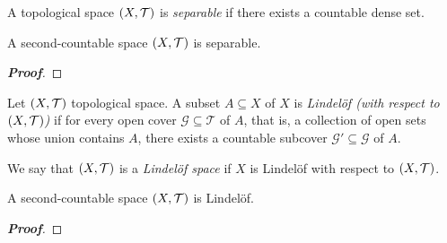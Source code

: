 \begin{definition}
  A topological space $\left(X,\mathcal{T}\right)$ is \textit{separable} if there exists a countable dense set.
\end{definition}

\begin{proposition}
  A second-countable space $\left(X,\mathcal{T}\right)$ is separable.

  \begin{proof}[\rm\textbf{Proof}]
    
  \end{proof}
\end{proposition}

\begin{definition}
  Let  $\left(X,\mathcal{T}\right)$ topological space. A subset $A\subseteq X$ of $X$ is \textit{Lindelöf (with respect to $\left(X,\mathcal{T}\right)$)} if for every open cover $\mathcal{G}\subseteq\mathcal{T}$ of $A$, that is, a collection of open sets whose union contains $A$, there exists a countable subcover $\mathcal{G}'\subseteq\mathcal{G}$ of $A$.

  We say that $\left(X,\mathcal{T}\right)$ is a \textit{Lindelöf space} if $X$ is Lindelöf with respect to $\left(X,\mathcal{T}\right)$.
\end{definition}

\begin{proposition}
  A second-countable space $\left(X,\mathcal{T}\right)$ is Lindelöf.
  
  \begin{proof}[\rm\textbf{Proof}]
    
  \end{proof}
\end{proposition}